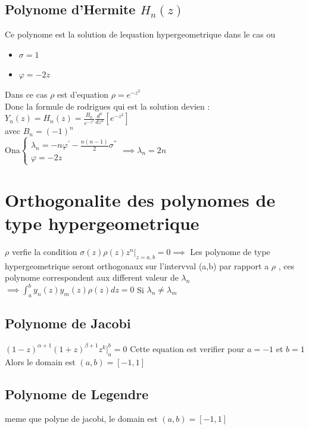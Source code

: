 \documentclass[12pt]{book}
\begin{document}
            \subsection*{Polynome d'Hermite $H_n(z)$}
                Ce polynome est la solution de lequation hypergeometrique dans le cas ou 
                \begin{itemize}
                    \item $\sigma = 1$
                    \item $\varphi = -2z$
                \end{itemize} 
                Dans ce cas $\rho$ est d'equation $\rho = e^{-z^2}$  \\
                Donc la formule de rodrigues qui est la solution devien : \\
                $ Y_n(z) = H_n(z) =  \frac{B_n}{e^{-z^2}}\frac{d^n}{dz^n}\left[e^{-z^2}\right] $ \\
                avec $B_n =(-1)^n$\\
                Ona$ \begin{cases}
                    \lambda_n = -n\varphi^{'} - \frac{n(n-1)}{2}\sigma^{''} \\
                    \varphi  = -2z
                \end{cases} \implies \lambda_n = 2n$ 
        \section{Orthogonalite des polynomes de type hypergeometrique}
            $\rho$ verfie la condition $\sigma(z)\rho(z)z^n|_{z=a,b} =0 \implies$ Les polynome de type hypergeometrique seront orthogonaux sur l'intervval (a,b) par rapport a $\rho$ , ces polynome correspondent aux different valeur de $\lambda_n$ \\
            $\implies \int^b_ay_n(z)y_m(z)\rho(z)dz =0$ Si $\lambda_n \not = \lambda_m$
            \subsection*{Polynome de Jacobi}
                $(1-z)^{\alpha +1}(1+z)^{\beta +1}z^k|^b_a =0$ Cette equation est verifier pour $a=-1 $ et $ b=1 $ \\
                Alors le domain est $ (a,b) = [-1,1] $ 
            \subsection*{Polynome de Legendre}
                meme que polyne de jacobi, le domain est $ (a,b) = [-1,1] $ 
\end{document}
